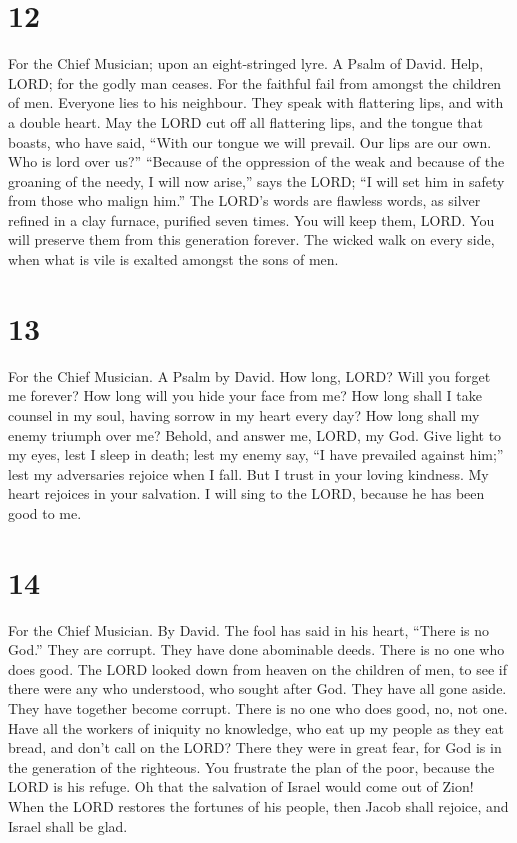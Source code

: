 \hypertarget{section-11}{%
\section{12}\label{section-11}}

For the Chief Musician; upon an eight-stringed lyre. A Psalm of David.
 Help, LORD; for the godly man ceases. For the faithful fail
from amongst the children of men.  Everyone lies to his
neighbour. They speak with flattering lips, and with a double heart.
 May the LORD cut off all flattering lips, and the tongue
that boasts,  who have said, ``With our tongue we will
prevail. Our lips are our own. Who is lord over us?'' 
``Because of the oppression of the weak and because of the groaning of
the needy, I will now arise,'' says the LORD; ``I will set him in safety
from those who malign him.''  The LORD's words are flawless
words, as silver refined in a clay furnace, purified seven times.
 You will keep them, LORD. You will preserve them from this
generation forever.  The wicked walk on every side, when
what is vile is exalted amongst the sons of men.

\hypertarget{section-12}{%
\section{13}\label{section-12}}

For the Chief Musician. A Psalm by David.  How long, LORD?
Will you forget me forever? How long will you hide your face from me?
 How long shall I take counsel in my soul, having sorrow in
my heart every day? How long shall my enemy triumph over me?
 Behold, and answer me, LORD, my God. Give light to my eyes,
lest I sleep in death;  lest my enemy say, ``I have
prevailed against him;'' lest my adversaries rejoice when I fall.
 But I trust in your loving kindness. My heart rejoices in
your salvation.  I will sing to the LORD, because he has
been good to me.

\hypertarget{section-13}{%
\section{14}\label{section-13}}

For the Chief Musician. By David.  The fool has said in his
heart, ``There is no God.'' They are corrupt. They have done abominable
deeds. There is no one who does good.  The LORD looked down
from heaven on the children of men, to see if there were any who
understood, who sought after God.  They have all gone aside.
They have together become corrupt. There is no one who does good, no,
not one.  Have all the workers of iniquity no knowledge, who
eat up my people as they eat bread, and don't call on the LORD?
 There they were in great fear, for God is in the generation
of the righteous.  You frustrate the plan of the poor,
because the LORD is his refuge.  Oh that the salvation of
Israel would come out of Zion! When the LORD restores the fortunes of
his people, then Jacob shall rejoice, and Israel shall be glad.

